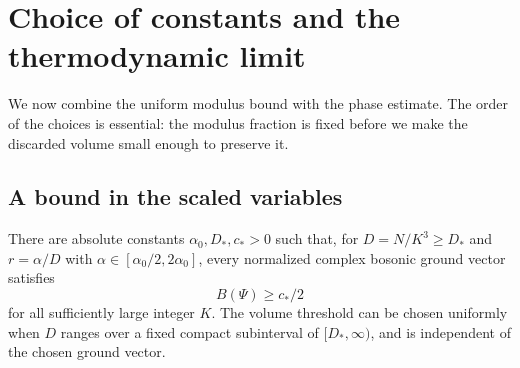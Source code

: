 \section{Choice of constants and the thermodynamic limit}\label{main:conclusion}

We now combine the uniform modulus bound with the phase estimate. The
order of the choices is essential: the modulus fraction is fixed before
we make the discarded volume small enough to preserve it.

\subsection{A bound in the scaled variables}

\begin{proposition}\label{main:scaled}
There are absolute constants $\alpha_0,D_*,c_*>0$ such that, for
$D=N/K^3\ge D_*$ and $r=\alpha/D$ with
$\alpha\in[\alpha_0/2,2\alpha_0]$, every normalized complex bosonic
ground vector satisfies
\[
 B(\Psi)\ge c_*/2
\]
for all sufficiently large integer $K$. The volume threshold can be
chosen uniformly when $D$ ranges over a fixed compact subinterval of
$[D_*,\infty)$, and is independent of the chosen ground vector.
\end{proposition}

